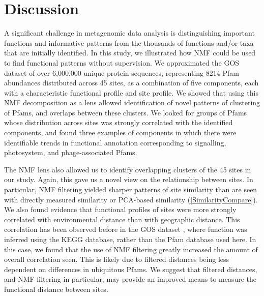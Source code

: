 
\section{Discussion}

A significant challenge in metagenomic data analysis is distinguishing important functions and informative patterns from the thousands of functions and/or taxa that are initially identified. In this study, we illustrated how NMF could be used to find functional patterns without supervision.  We approximated the GOS dataset of over 6,000,000 unique protein sequences, representing 8214 Pfam abundances distributed across 45 sites, as a combination of five components, each with a characteristic functional profile and site profile. We showed that using this NMF decomposition as a lens allowed identification of novel patterns of clustering of Pfams, and overlaps between these clusters.  We looked for groups of Pfams whose distribution across sites was strongly correlated with the identified components, and found three examples of components in which there were identifiable trends in functional annotation corresponding to signalling, photosystem, and phage-associated Pfams.

The NMF lens also allowed us to identify overlapping clusters of the 45 sites in our study.  Again, this gave us a novel view on the relationship between sites.   In particular, NMF filtering yielded sharper patterns of site similarity than are seen with directly measured similarity or PCA-based similarity (\ref{SimilarityCompare}). We also found evidence that functional profiles of sites were more strongly correlated with environmental distance than with geographic distance.  This correlation has been observed before in the GOS dataset \cite{raes_toward_2011}, where function was inferred using the KEGG database, rather than the Pfam database used here.  In this case, we found that the use of NMF filtering greatly increased the amount of overall correlation seen.  This is likely due to filtered distances being less dependent on differences in ubiquitous Pfams.  We suggest that filtered distances, and NMF filtering in particular, may provide an improved means to measure the functional distance between sites.


